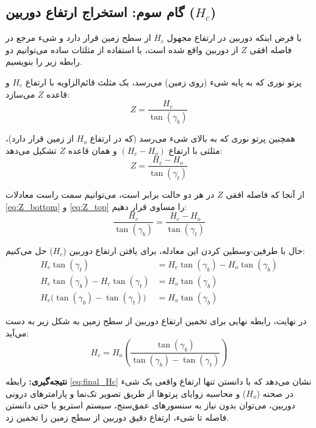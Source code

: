 \documentclass[12pt,a4paper]{article}
\begin{document}
\subsection{گام سوم: استخراج ارتفاع دوربین ($H_c$)}
با فرض اینکه دوربین در ارتفاع مجهول $H_c$ از سطح زمین قرار دارد و شیء مرجع در فاصله افقی $Z$ از دوربین واقع شده است، با استفاده از مثلثات ساده می‌توانیم دو رابطه زیر را بنویسیم. 

پرتو نوری که به پایه شیء (روی زمین) می‌رسد، یک مثلث قائم‌الزاویه با ارتفاع $H_c$ و قاعده $Z$ می‌سازد:
\begin{equation}
	\label{eq:Z_bottom}
	Z = \frac{H_c}{\tan(\gamma_b)}
\end{equation}

همچنین پرتو نوری که به بالای شیء می‌رسد (که در ارتفاع $H_o$ از زمین قرار دارد)، مثلثی با ارتفاع $(H_c - H_o)$ و همان قاعده $Z$ تشکیل می‌دهد:
\begin{equation}
	\label{eq:Z_top}
	Z = \frac{H_c - H_o}{\tan(\gamma_t)}
\end{equation}

از آنجا که فاصله افقی $Z$ در هر دو حالت برابر است، می‌توانیم سمت راست معادلات \ref{eq:Z_bottom} و \ref{eq:Z_top} را مساوی قرار دهیم:
\begin{equation}
	\frac{H_c}{\tan(\gamma_b)} = \frac{H_c - H_o}{\tan(\gamma_t)}
\end{equation}

حال با طرفین-وسطین کردن این معادله، برای یافتن ارتفاع دوربین ($H_c$) حل می‌کنیم:
\begin{align}
	H_c \tan(\gamma_t) &= H_c \tan(\gamma_b) - H_o \tan(\gamma_b) \\
	H_c \tan(\gamma_b) - H_c \tan(\gamma_t) &= H_o \tan(\gamma_b) \\
	H_c \big( \tan(\gamma_b) - \tan(\gamma_t) \big) &= H_o \tan(\gamma_b)
\end{align}

در نهایت، رابطه نهایی برای تخمین ارتفاع دوربین از سطح زمین به شکل زیر به دست می‌آید:
\begin{equation}
	\label{eq:final_Hc}
	H_c = H_o \left( \frac{\tan(\gamma_b)}{\tan(\gamma_b) - \tan(\gamma_t)} \right)
\end{equation}

\textbf{نتیجه‌گیری:} رابطه \ref{eq:final_Hc} نشان می‌دهد که با دانستن تنها ارتفاع واقعی یک شیء در صحنه ($H_o$) و محاسبه زوایای پرتوها از طریق تصویر تک‌نما و پارامترهای درونی دوربین، می‌توان بدون نیاز به سنسورهای عمق‌سنج، سیستم استریو یا حتی دانستن فاصله تا شیء، ارتفاع دقیق دوربین از سطح زمین را تخمین زد.
\end{document}
